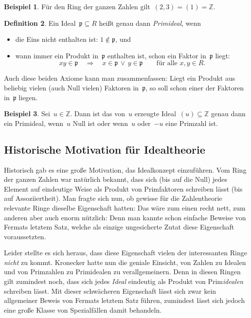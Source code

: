 \documentclass[a4paper,ngerman,12pt]{scrartcl}
\theoremstyle{definition}
\newtheorem{defn}{Definition}[section]
\newtheorem{bsp}[defn]{Beispiel}
\theoremstyle{plain}
\theoremstyle{remark}
\newcommand{\ZZ}{\mathbb{Z}}
\newcommand{\pp}{\mathfrak{p}}
\renewcommand{\_}{\mathpunct{.}\,}
\newcommand{\?}{\,{:}\,}
\begin{document}
\begin{bsp}Für den Ring der ganzen Zahlen gilt~$(2,3) = (1) = \ZZ$.\end{bsp}

\begin{defn}Ein Ideal~$\pp \subseteq R$ heißt genau dann \emph{Primideal}, wenn
\begin{itemize}
\item die Eins nicht enthalten ist: $1 \not\in \pp$, und
\item wann immer ein Produkt in~$\pp$ enthalten ist, schon ein Faktor in~$\pp$
liegt:
\[ xy \in \pp \quad\Longrightarrow\quad x \in \pp \,\vee\, y \in \pp
  \qquad\text{für alle~$x,y \in R$.} \]
\end{itemize}
\end{defn}

Auch diese beiden Axiome kann man zusammenfassen: Liegt ein Produkt aus beliebig
vielen (auch Null vielen) Faktoren in~$\pp$, so soll schon einer der
Faktoren in~$\pp$ liegen.

\begin{bsp}Sei~$u \in \ZZ$. Dann ist das von~$u$ erzeugte Ideal~$(u) \subseteq
\ZZ$ genau dann ein Primideal, wenn~$u$ Null ist oder wenn~$u$ oder~$-u$ eine
Primzahl ist.\end{bsp}


\subsection{Historische Motivation für Idealtheorie}

Historisch gab es eine große Motivation, das Idealkonzept einzuführen. Vom Ring
der ganzen Zahlen war natürlich bekannt, dass sich (bis auf die Null) jedes
Element auf eindeutige Weise als Produkt von Primfaktoren schreiben lässt (bis
auf Assoziiertheit). Man
fragte sich nun, ob gewisse für die Zahlentheorie relevante Ringe dieselbe
Eigenschaft hatten: Das wäre zum einen recht nett, zum anderen aber auch
enorm nützlich: Denn man kannte schon einfache Beweise von Fermats letztem
Satz, welche als einzige ungesicherte Zutat diese Eigenschaft voraussetzten.

Leider stellte es sich heraus, dass diese Eigenschaft vielen der interessanten
Ringe \emph{nicht} zu kommt. Kronecker hatte nun die geniale Einsicht, von
Zahlen zu Idealen und von Primzahlen zu Primidealen zu verallgemeinern. Denn in
diesen Ringen gilt zumindest noch, dass sich jedes \emph{Ideal} eindeutig als
Produkt von Prim\emph{idealen} schreiben lässt. Mit dieser schwächeren Eigenschaft
lässt sich zwar kein allgemeiner Beweis von Fermats letztem Satz führen,
zumindest lässt sich jedoch eine große Klasse von Spezialfällen damit
behandeln.
\end{document}
